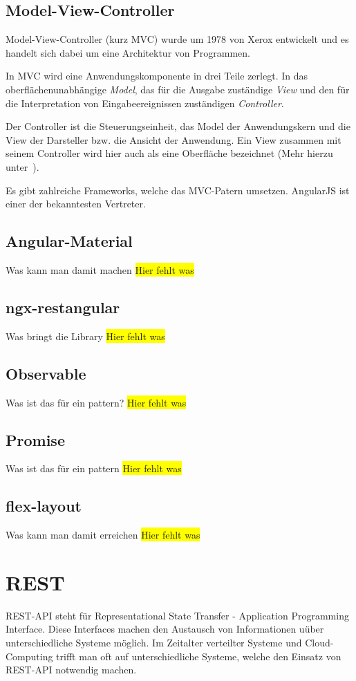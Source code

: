 \subsection{Model-View-Controller}
Model-View-Controller (kurz MVC) wurde um 1978 von Xerox entwickelt und es handelt sich dabei um eine Architektur von
Programmen.

In MVC wird eine Anwendungskomponente in drei Teile zerlegt. In das oberflächenunabhängige \textit{Model}, das für die
Ausgabe zuständige \textit{View} und den für die Interpretation von Eingabeereignissen zuständigen \textit{Controller}.

Der Controller ist die Steuerungseinheit, das Model der Anwendungskern und die View der Darsteller bzw. die Ansicht der
Anwendung. Ein View zusammen mit seinem Controller wird hier auch als eine Oberfläche bezeichnet (Mehr hierzu
unter~\cite{book_grundlagen_mvc}).

Es gibt zahlreiche Frameworks, welche das MVC-Patern umsetzen. AngularJS ist einer der bekanntesten Vertreter.

\subsection{Angular-Material}
Was kann man damit machen
\colorbox{yellow}{Hier fehlt was}

\subsection{ngx-restangular}
Was bringt die Library
\colorbox{yellow}{Hier fehlt was}

\subsection{Observable}
Was ist das für ein pattern?
\colorbox{yellow}{Hier fehlt was}

\subsection{Promise}
Was ist das für ein pattern
\colorbox{yellow}{Hier fehlt was}

\subsection{flex-layout}
Was kann man damit erreichen
\colorbox{yellow}{Hier fehlt was}

\section{REST}
REST-API steht für Representational State Transfer - Application Programming Interface. Diese Interfaces machen den
Austausch von Informationen uüber unterschiedliche Systeme möglich. Im Zeitalter verteilter Systeme und Cloud-Computing
trifft man oft auf unterschiedliche Systeme, welche den Einsatz von REST-API notwendig machen.

